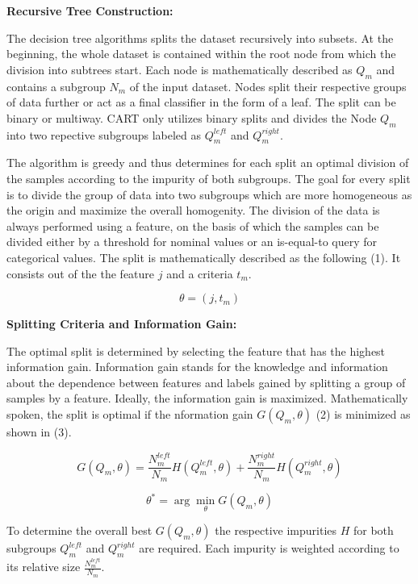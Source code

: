 \textbf{Recursive Tree Construction:} 

The decision tree algorithms splits the dataset recursively into subsets. At the beginning, the whole dataset is 
contained within the root node from which the division into subtrees start. Each node is mathematically described
as \(Q_{m}\) and contains a subgroup \(N_{m}\) of the input dataset. Nodes split their respective groups of data 
further or act as a final classifier in the form of a leaf. The split can be 
binary or multiway. \ac{CART} only utilizes binary splits and divides the Node \(Q_{m}\) into two repective subgroups 
labeled as \(Q^{left}_{m}\) and \(Q^{right}_{m}\). 

The algorithm is greedy and thus determines for each split an optimal division of the samples according to 
the impurity of both subgroups. The goal for every split is to divide the group of data into two subgroups which are 
more homogeneous as the origin and maximize the overall homogenity. The division of the data is 
always performed using a feature, on the basis of which the samples can be divided either by a threshold for 
nominal values or an is-equal-to query for categorical values. The split is mathematically described as the 
following (1). It consists out of the the feature \(j\) and a criteria \(t_{m}\).

\begin{equation}
\theta = (j, t_{m})
\end{equation}

\textbf{Splitting Criteria and Information Gain:}

The optimal split is determined by selecting the feature that has the highest information gain. Information gain 
stands for the knowledge and information about the dependence between features and labels gained by splitting a group 
of samples by a feature. Ideally, the information gain is maximized. Mathematically spoken, the split is optimal if 
the nformation gain \(G(Q_{m}, \theta)\) (2) is minimized as shown in (3). 

\begin{equation}
G(Q_{m},\theta) = \frac{N^{left}_{m}}{N_{m}} H(Q^{left}_{m}, \theta ) + \frac{N^{right}_{m}}{N_{m}} H(Q^{right}_{m}, \theta )
\end{equation}

\begin{equation}
\theta ^* = \arg \min_{\theta}  G(Q_{m}, \theta)
\end{equation}

To determine the overall best \(G(Q_{m}, \theta)\) the respective impurities \(H\) for both subgroups \(Q^{left}_{m}\) 
and \(Q^{right}_{m}\) are required. Each impurity is weighted according to its relative size 
\(\frac{N^{left}_{m}}{N_{m}}\).

